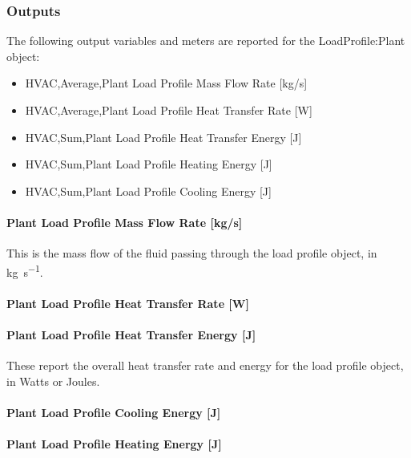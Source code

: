 \subsubsection{Outputs}\label{outputs-020}

The following output variables and meters are reported for the LoadProfile:Plant object:

\begin{itemize}
\item HVAC,Average,Plant Load Profile Mass Flow Rate [kg/s]
\item HVAC,Average,Plant Load Profile Heat Transfer Rate [W]
\item HVAC,Sum,Plant Load Profile Heat Transfer Energy [J]
\item HVAC,Sum,Plant Load Profile Heating Energy [J]
\item HVAC,Sum,Plant Load Profile Cooling Energy [J]
\end{itemize}

\paragraph{Plant Load Profile Mass Flow Rate [kg/s]}\label{plant-load-profile-mass-flow-rate-kgs}

This is the mass flow of the fluid passing through the load profile object, in \si{\kg\per\s}.

\paragraph{Plant Load Profile Heat Transfer Rate [W]}\label{plant-load-profile-heat-transfer-rate-w}

\paragraph{Plant Load Profile Heat Transfer Energy [J]}\label{plant-load-profile-heat-transfer-energy-j}

These report the overall heat transfer rate and energy for the load profile object, in Watts or Joules.

\paragraph{Plant Load Profile Cooling Energy [J]}\label{plant-load-profile-cooling-energy-j}

\paragraph{Plant Load Profile Heating Energy [J]}\label{plant-load-profile-heating-energy-j}

